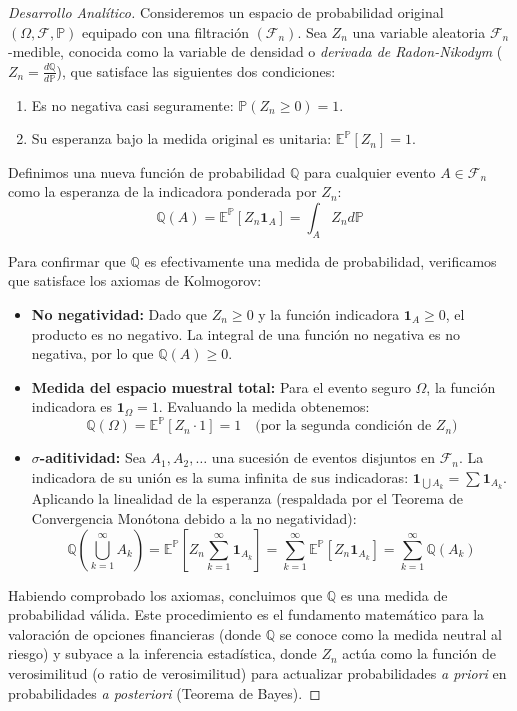 \documentclass[12pt, a4paper]{article}
\begin{document}
\begin{proof}[Desarrollo Analítico]
Consideremos un espacio de probabilidad original $(\Omega, \mathcal{F}, \mathbb{P})$ equipado con una filtración $(\mathcal{F}_n)$. Sea $Z_n$ una variable aleatoria $\mathcal{F}_n$-medible, conocida como la variable de densidad o \textit{derivada de Radon-Nikodym} ($Z_n = \frac{d\mathbb{Q}}{d\mathbb{P}}$), que satisface las siguientes dos condiciones:
\begin{enumerate}
    \item Es no negativa casi seguramente: $\mathbb{P}(Z_n \ge 0) = 1$.
    \item Su esperanza bajo la medida original es unitaria: $\mathbb{E}^{\mathbb{P}}[Z_n] = 1$.
\end{enumerate}

Definimos una nueva función de probabilidad $\mathbb{Q}$ para cualquier evento $A \in \mathcal{F}_n$ como la esperanza de la indicadora ponderada por $Z_n$:
$$ \mathbb{Q}(A) = \mathbb{E}^{\mathbb{P}}[Z_n \mathbf{1}_A] = \int_A Z_n d\mathbb{P} $$

Para confirmar que $\mathbb{Q}$ es efectivamente una medida de probabilidad, verificamos que satisface los axiomas de Kolmogorov:
\begin{itemize}
    \item \textbf{No negatividad:} Dado que $Z_n \ge 0$ y la función indicadora $\mathbf{1}_A \ge 0$, el producto es no negativo. La integral de una función no negativa es no negativa, por lo que $\mathbb{Q}(A) \ge 0$.
    \item \textbf{Medida del espacio muestral total:} Para el evento seguro $\Omega$, la función indicadora es $\mathbf{1}_\Omega = 1$. Evaluando la medida obtenemos:
    $$ \mathbb{Q}(\Omega) = \mathbb{E}^{\mathbb{P}}[Z_n \cdot 1] = 1 \quad \text{(por la segunda condición de } Z_n \text{)} $$
    \item \textbf{$\sigma$-aditividad:} Sea $A_1, A_2, \dots$ una sucesión de eventos disjuntos en $\mathcal{F}_n$. La indicadora de su unión es la suma infinita de sus indicadoras: $\mathbf{1}_{\bigcup A_k} = \sum \mathbf{1}_{A_k}$. Aplicando la linealidad de la esperanza (respaldada por el Teorema de Convergencia Monótona debido a la no negatividad):
    $$ \mathbb{Q}\left(\bigcup_{k=1}^\infty A_k\right) = \mathbb{E}^{\mathbb{P}}\left[ Z_n \sum_{k=1}^\infty \mathbf{1}_{A_k} \right] = \sum_{k=1}^\infty \mathbb{E}^{\mathbb{P}}[Z_n \mathbf{1}_{A_k}] = \sum_{k=1}^\infty \mathbb{Q}(A_k) $$
\end{itemize}

Habiendo comprobado los axiomas, concluimos que $\mathbb{Q}$ es una medida de probabilidad válida. Este procedimiento es el fundamento matemático para la valoración de opciones financieras (donde $\mathbb{Q}$ se conoce como la medida neutral al riesgo) y subyace a la inferencia estadística, donde $Z_n$ actúa como la función de verosimilitud (o ratio de verosimilitud) para actualizar probabilidades \textit{a priori} en probabilidades \textit{a posteriori} (Teorema de Bayes).
\end{proof}
\end{document}
